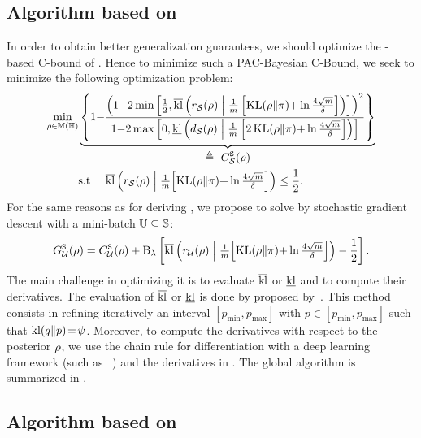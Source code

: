 \subsection{Algorithm based on }

In order to obtain better generalization guarantees, we should optimize the \citeauthor{Seeger2002}-based C-bound of . 
Hence to minimize such a PAC-Bayesian C-Bound, we seek to minimize the following optimization problem:
\begin{align*}
    \min_{\rho\in\mathbb{M}(\mathbb{H})}& \underbrace{\left\{ 1{-}\frac{\left(1{-}2\min\left[\frac{1}{2},  \overline{\operatorname{kl}} \left( r_{\mathcal{S}}(\rho) \;\middle|\; \frac{1}{m}\left[ \operatorname{KL}(\rho\|\pi){+}\ln\tfrac{4\sqrt{m}}{\delta}\right]\right)\right]\right)^2}{1{-}2\max\left[ 0,
\underline{\operatorname{kl}}\left( d_{\mathcal{S}}(\rho) \;\middle|\; \frac{1}{m}\left[ 2\operatorname{KL}(\rho\|\pi){+}\ln\tfrac{4\sqrt{m}}{\delta}\right]\right)\right]}\right\}}_{\displaystyle \triangleq\ {C}^{\tt S}_{\mathcal{S}}(\rho)}\\
&\text{s.t }\quad \overline{\operatorname{kl}} \left( r_{\mathcal{S}}(\rho) \;\middle|\; \tfrac{1}{m}\!\left[ \operatorname{KL}(\rho\|\pi){+}\ln\tfrac{4\sqrt{m}}{\delta}\right]\right)\le\frac{1}{2}.
\end{align*}
For the same reasons as for deriving , we propose to solve by stochastic gradient descent with a mini-batch $\mathbb{U}\subseteq\mathbb{S}$:
\begin{align*}
G^{\tt S}_{\mathcal{U}}(\rho) = {C}^{\tt S}_{\mathcal{U}}(\rho) + \operatorname{B}_{\lambda}\left[\overline{\operatorname{kl}} \left( r_{\mathcal{U}}(\rho) \;\middle|\; \tfrac{1}{m}\!\left[ \operatorname{KL}(\rho\|\pi){+}\ln\tfrac{4\sqrt{m}}{\delta}\right]\right)-\frac{1}{2}\right].
\end{align*}
The main challenge in optimizing it is to evaluate $\overline{\operatorname{kl}}$ or $\underline{\operatorname{kl}}$ and to compute their derivatives.
The evaluation of $\overline{\operatorname{kl}}$ or $\underline{\operatorname{kl}}$ is done by  proposed by~\citet{ReebDoerrGerwinnRakitsch2018}.
This method consists in refining iteratively an interval $[p_{\text{min}}, p_{\text{max}}]$ with \mbox{$p\in [p_{\text{min}}, p_{\text{max}}]$} such that \mbox{$\operatorname{kl}(q\|p)\!=\!\psi$}.
Moreover, to compute the derivatives with respect to the posterior $\rho$, we use the chain rule for differentiation with a deep learning framework (such as \pytorch~\citep{Paszke2019}) and the derivatives in . 
The global algorithm is summarized in .

\subsection{Algorithm based on }

